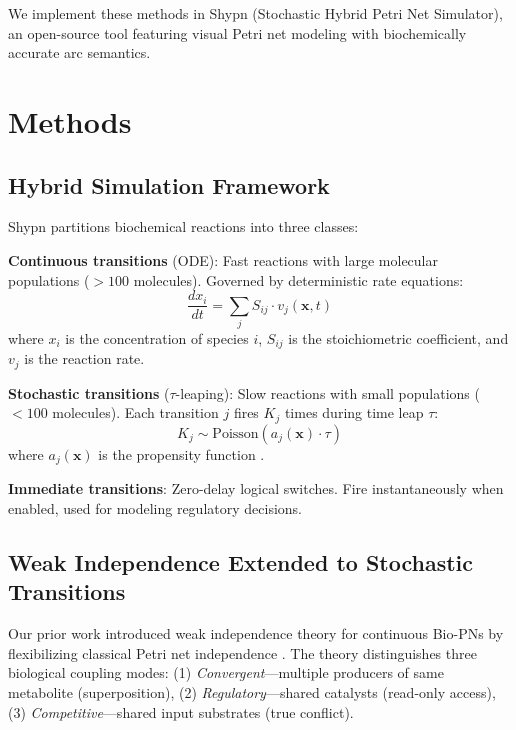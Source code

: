 \documentclass{bioinfo}
\begin{document}
We implement these methods in Shypn (Stochastic Hybrid Petri Net Simulator), an open-source tool featuring visual Petri net modeling with biochemically accurate arc semantics.

\section{Methods}

\subsection{Hybrid Simulation Framework}

Shypn partitions biochemical reactions into three classes:

\textbf{Continuous transitions} (ODE): Fast reactions with large molecular populations ($>100$ molecules). Governed by deterministic rate equations:
\begin{equation}
\frac{dx_i}{dt} = \sum_{j} S_{ij} \cdot v_j(\mathbf{x}, t)
\end{equation}
where $x_i$ is the concentration of species $i$, $S_{ij}$ is the stoichiometric coefficient, and $v_j$ is the reaction rate.

\textbf{Stochastic transitions} ($\tau$-leaping): Slow reactions with small populations ($<100$ molecules). Each transition $j$ fires $K_j$ times during time leap $\tau$:
\begin{equation}
K_j \sim \text{Poisson}(a_j(\mathbf{x}) \cdot \tau)
\end{equation}
where $a_j(\mathbf{x})$ is the propensity function \citep{gillespie1977exact}.

\textbf{Immediate transitions}: Zero-delay logical switches. Fire instantaneously when enabled, used for modeling regulatory decisions.

\subsection{Weak Independence Extended to Stochastic Transitions}

Our prior work \citep{eugenio2024weak} introduced weak independence theory for continuous Bio-PNs by flexibilizing classical Petri net independence \citep{petri1962communication,murata1989petri,chaouiya2007petri}. The theory distinguishes three biological coupling modes: (1) \emph{Convergent}---multiple producers of same metabolite (superposition), (2) \emph{Regulatory}---shared catalysts (read-only access), (3) \emph{Competitive}---shared input substrates (true conflict).
\end{document}
